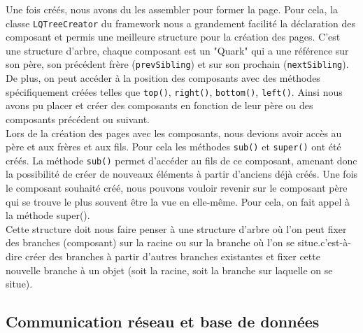 \documentclass{report}
\begin{document}
Une fois créés, nous avons du les assembler pour former la page. Pour cela, la classe \verb!LQTreeCreator! du framework nous a grandement facilité la déclaration des composant et permis une meilleure structure pour la création des pages. C'est une structure d'arbre, chaque composant est un "Quark" qui a une référence sur son père, son précédent frère (\verb!prevSibling!) et sur son prochain (\verb!nextSibling!). 
De plus, on peut accéder à la position des composants avec des méthodes spécifiquement créées telles que \verb!top()!, \verb!right()!, \verb!bottom()!, \verb!left()!. Ainsi nous avons pu placer et créer des composants en fonction de leur père ou des composants précédent ou suivant. \\
Lors de la création des pages avec les composants, nous devions avoir accès au père et aux frères et aux fils. Pour cela les méthodes \verb!sub()! et \verb!super()! ont été créés. La méthode \verb!sub()! permet d'accéder au fils de ce composant, amenant donc la possibilité de créer de nouveaux éléments à partir d'anciens déjà créés.
Une fois le composant souhaité créé, nous pouvons vouloir revenir sur le composant père qui se trouve le plus souvent être la vue en elle-même. Pour cela, on fait appel à la méthode super().\\
Cette structure doit nous faire penser à une structure d'arbre où l'on peut fixer des branches (composant) sur la racine ou sur la branche où l'on se situe.c'est-à-dire créer des branches à partir d'autres branches existantes et fixer cette nouvelle branche à un objet (soit la racine, soit la branche sur laquelle on se situe). 

\subsection{Communication réseau et base de données}
\end{document}
